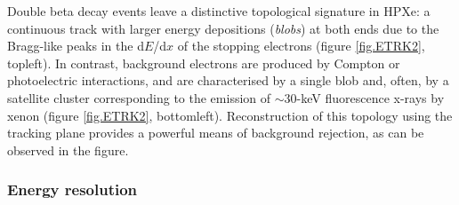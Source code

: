 %

Double beta decay events leave a distinctive topological signature in HPXe: a continuous track with larger energy depositions (\emph{blobs}) at both ends due to the Bragg-like peaks in the d$E$/d$x$ of the stopping electrons (figure \ref{fig.ETRK2}, topleft). In contrast, background electrons are produced by Compton or photoelectric interactions, and are characterised by a single blob and, often, by a satellite cluster corresponding to the emission of $\sim30$-keV fluorescence x-rays by xenon (figure \ref{fig.ETRK2}, bottomleft).
Reconstruction of this topology using the tracking plane provides a powerful means of background rejection, as can be observed in the figure. 

%

\subsubsection*{Energy resolution}

